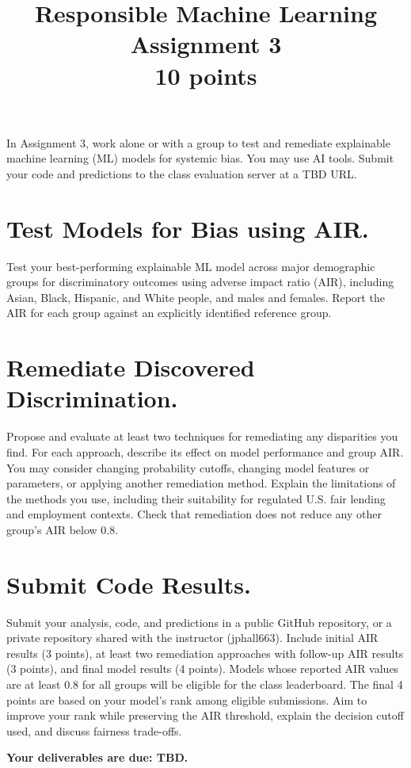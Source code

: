 \documentclass[fleqn]{article}
\title{Responsible Machine Learning\\\Large{Assignment 3}\\\Large{10 points}}
\begin{document}
\maketitle

\noindent In Assignment 3, work alone or with a group to test and remediate explainable machine learning (ML) models for systemic bias. You may use AI tools. Submit your code and predictions to the class evaluation server at a TBD URL.

\section{Test Models for Bias using AIR.}

Test your best-performing explainable ML model across major demographic groups for discriminatory outcomes using adverse impact ratio (AIR), including Asian, Black, Hispanic, and White people, and males and females. Report the AIR for each group against an explicitly identified reference group.

\section{Remediate Discovered Discrimination.}

Propose and evaluate at least two techniques for remediating any disparities you find. For each approach, describe its effect on model performance and group AIR. You may consider changing probability cutoffs, changing model features or parameters, or applying another remediation method. Explain the limitations of the methods you use, including their suitability for regulated U.S. fair lending and employment contexts. Check that remediation does not reduce any other group's AIR below 0.8.

\section{Submit Code Results.}

Submit your analysis, code, and predictions in a public GitHub repository, or a private repository shared with the instructor (jphall663). Include initial AIR results (3 points), at least two remediation approaches with follow-up AIR results (3 points), and final model results (4 points). Models whose reported AIR values are at least 0.8 for all groups will be eligible for the class leaderboard. The final 4 points are based on your model's rank among eligible submissions. Aim to improve your rank while preserving the AIR threshold, explain the decision cutoff used, and discuss fairness trade-offs.

\noindent \textbf{Your deliverables are due: TBD.}\\
\end{document}
